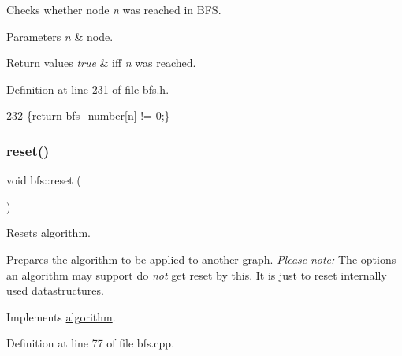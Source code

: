 Checks whether node {\itshape n} was reached in B\+FS. 


\begin{DoxyParams}{Parameters}
{\em n} & node. \\
\hline
\end{DoxyParams}

\begin{DoxyRetVals}{Return values}
{\em true} & iff {\itshape n} was reached. \\
\hline
\end{DoxyRetVals}


Definition at line 231 of file bfs.\+h.


\begin{DoxyCode}
232     \{\textcolor{keywordflow}{return} \mbox{\hyperlink{classbfs_a59d0c5c5ad2715776b20b1aec03dbc3a}{bfs\_number}}[n] != 0;\}
\end{DoxyCode}
\mbox{\label{classbfs_a6398bc230f9723cd5fdd32cd603647cc}} 
\subsubsection{\texorpdfstring{reset()}{reset()}}
{\footnotesize\ttfamily void bfs\+::reset (\begin{DoxyParamCaption}{ }\end{DoxyParamCaption})\hspace{0.3cm}{\ttfamily [virtual]}}



Resets algorithm. 

Prepares the algorithm to be applied to another graph. {\itshape Please} {\itshape note\+:} The options an algorithm may support do {\itshape not} get reset by this. It is just to reset internally used datastructures. 

Implements \mbox{\hyperlink{classalgorithm_a21aba63d066ae7897de6ca7d8425c408}{algorithm}}.



Definition at line 77 of file bfs.\+cpp.


